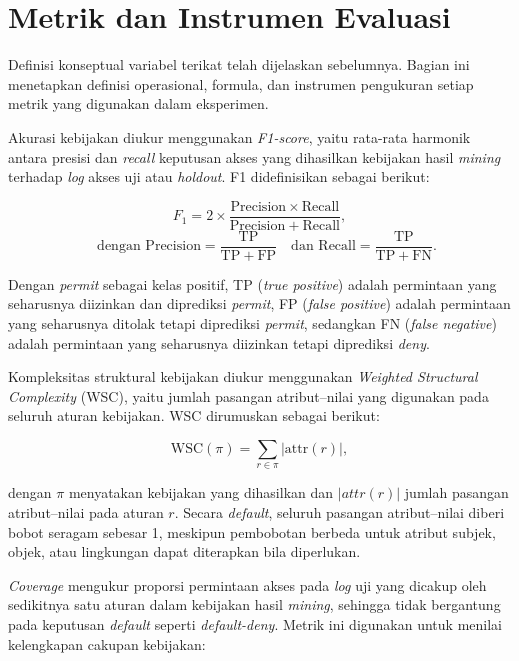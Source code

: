 \section{Metrik dan Instrumen Evaluasi}

Definisi konseptual variabel terikat telah dijelaskan sebelumnya. 
Bagian ini menetapkan definisi operasional, formula, dan instrumen pengukuran setiap metrik yang digunakan dalam eksperimen.

Akurasi kebijakan diukur menggunakan \textit{F1-score}, yaitu rata-rata harmonik antara presisi dan \textit{recall} keputusan akses yang dihasilkan kebijakan hasil \textit{mining} terhadap \textit{log} akses uji atau \textit{holdout}. 
F1\label{first:f1} didefinisikan sebagai berikut:

\[
F_1 = 2 \times \frac{\mathrm{Precision} \times \mathrm{Recall}}{\mathrm{Precision} + \mathrm{Recall}},
\]
\[
\quad
\text{dengan }
\mathrm{Precision} = \frac{\mathrm{TP}}{\mathrm{TP} + \mathrm{FP}}
\quad
\text{dan }
\mathrm{Recall} = \frac{\mathrm{TP}}{\mathrm{TP} + \mathrm{FN}}.
\]
\label{first:precision}\label{first:recall}

Dengan \textit{permit} sebagai kelas positif, TP\label{first:tp} (\textit{true positive}) adalah permintaan yang seharusnya diizinkan dan diprediksi \textit{permit}, FP\label{first:fp} (\textit{false positive}) adalah permintaan yang seharusnya ditolak tetapi diprediksi \textit{permit}, sedangkan FN\label{first:fn} (\textit{false negative}) adalah permintaan yang seharusnya diizinkan tetapi diprediksi \textit{deny}.

Kompleksitas struktural kebijakan diukur menggunakan \textit{Weighted Structural Complexity} (WSC), yaitu jumlah pasangan atribut–nilai yang digunakan pada seluruh aturan kebijakan. 
WSC dirumuskan sebagai berikut:

\[
\mathrm{WSC}(\pi) = \sum_{r \in \pi} \lvert \mathrm{attr}(r) \rvert,
\]\label{first:symbol-r}

dengan $\pi$ menyatakan kebijakan yang dihasilkan dan $|attr(r)|$\label{first:symbol-attrr} jumlah pasangan atribut–nilai pada aturan $r$. 
Secara \textit{default}, seluruh pasangan atribut–nilai diberi bobot seragam sebesar 1, meskipun pembobotan berbeda untuk atribut subjek, objek, atau lingkungan dapat diterapkan bila diperlukan.

\textit{Coverage} mengukur proporsi permintaan akses pada \textit{log} uji yang dicakup oleh sedikitnya satu aturan dalam kebijakan hasil \textit{mining}, sehingga tidak bergantung pada keputusan \textit{default} seperti \textit{default-deny}. 
Metrik ini digunakan untuk menilai kelengkapan cakupan kebijakan:

